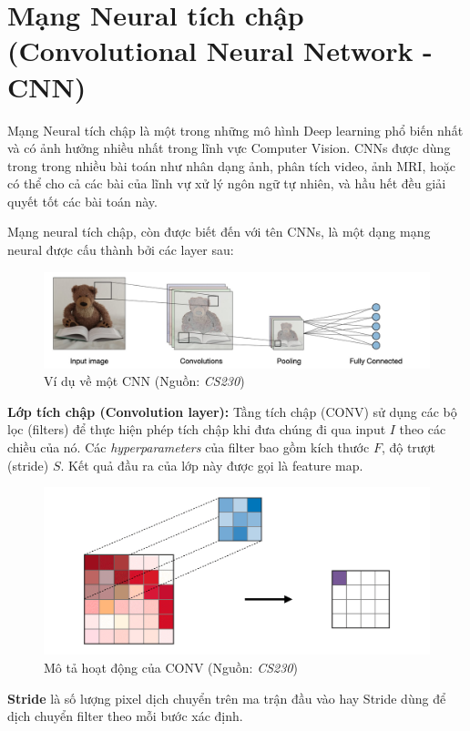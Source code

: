 \documentclass[a4paper, 12pt]{report}
\begin{document}
\section{Mạng Neural tích chập (Convolutional Neural Network - CNN)}
Mạng Neural tích chập là một trong những mô hình Deep learning phổ biến nhất và có ảnh hưởng nhiều nhất trong lĩnh vực Computer Vision. CNNs được dùng trong trong nhiều bài toán như nhân dạng ảnh, phân tích video, ảnh MRI, hoặc có thể cho cả các bài của lĩnh vự xử lý ngôn ngữ tự nhiên, và hầu hết đều giải quyết tốt các bài toán này.\par
Mạng neural tích chập, còn được biết đến với tên CNNs, là một dạng mạng neural được cấu thành bởi các layer sau:\par
\begin{figure}[!h]
	\centering
	\includegraphics[width=1\linewidth]{Images/cnn1}
	\caption{Ví dụ về một CNN (Nguồn: \textit{CS230})}
	\label{fig:nn3}
\end{figure}
\textbf{Lớp tích chập (Convolution layer):} Tầng tích chập (CONV) sử dụng các bộ lọc (filters) để thực hiện phép tích chập khi đưa chúng đi qua input $I$ theo các chiều của nó. Các \textit{hyperparameters} của filter bao gồm  kích thước $F$, độ trượt (stride) $S$. Kết quả đầu ra của lớp này được gọi là feature map.\par
\begin{figure}[!h]
	\centering
	\includegraphics[width=1\linewidth]{Images/cnn2}
	\caption{Mô tả hoạt động của CONV (Nguồn: \textit{CS230})}
	\label{fig:cnn2}
\end{figure}
\textbf{Stride} là số lượng pixel dịch chuyển trên ma trận đầu vào hay Stride dùng để dịch chuyển filter theo mỗi bước xác định.\par
\end{document}
